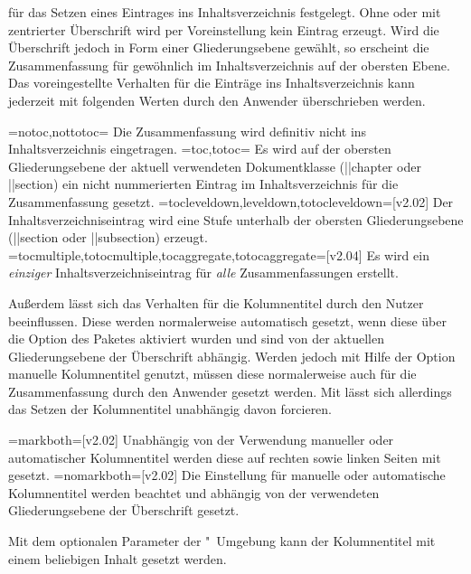 \begin{DeclareEntity*}{}
\begin{DeclareEntity*}{}
\begin{DeclareEntity*}{}
\begin{Declaration}
für das Setzen eines Eintrages ins Inhaltsverzeichnis festgelegt. Ohne oder mit 
zentrierter Überschrift wird per Voreinstellung kein Eintrag erzeugt. Wird die 
Überschrift jedoch in Form einer Gliederungsebene gewählt, so erscheint die 
Zusammenfassung für gewöhnlich im Inhaltsverzeichnis auf der obersten Ebene. 
Das voreingestellte Verhalten für die Einträge ins Inhaltsverzeichnis kann 
jederzeit mit folgenden Werten durch den Anwender überschrieben werden.
%
\begin{DeclareValues}
\itemval=notoc,nottotoc=
  Die Zusammenfassung wird definitiv nicht ins Inhaltsverzeichnis eingetragen.
\itemval=toc,totoc=
  Es wird auf der obersten Gliederungsebene der aktuell verwendeten 
  Dokumentklasse (\Macro||{chapter} oder \Macro||{section}) ein nicht 
  nummerierten Eintrag im Inhaltsverzeichnis für die Zusammenfassung gesetzt.
\itemval=tocleveldown,leveldown,totocleveldown=[v2.02]
  Der Inhaltsverzeichniseintrag wird eine Stufe unterhalb der obersten 
  Gliederungsebene (\Macro||{section} oder \Macro||{subsection}) erzeugt.
\itemval=tocmultiple,totocmultiple,tocaggregate,totocaggregate=[v2.04]
  Es wird ein \emph{einziger} Inhaltsverzeichniseintrag für \emph{alle} 
  Zusammenfassungen erstellt.
\end{DeclareValues}
%
Außerdem lässt sich das Verhalten für die Kolumnentitel durch den Nutzer 
beeinflussen. Diese werden normalerweise automatisch gesetzt, wenn diese über 
die Option  des Paketes  aktiviert 
wurden und sind von der aktuellen Gliederungsebene der Überschrift abhängig. 
Werden jedoch mit Hilfe der Option  manuelle Kolumnentitel 
genutzt, müssen diese normalerweise auch für die Zusammenfassung durch den 
Anwender gesetzt werden. Mit  lässt sich allerdings 
das Setzen der Kolumnentitel unabhängig davon forcieren.
%
\begin{DeclareValues}
\itemval=markboth=[v2.02]
  Unabhängig von der Verwendung manueller oder automatischer Kolumnentitel 
  werden diese auf rechten sowie linken Seiten mit  gesetzt.
\itemval=nomarkboth=[v2.02]
  Die Einstellung für manuelle oder automatische Kolumnentitel werden beachtet 
  und abhängig von der verwendeten Gliederungsebene der Überschrift gesetzt.
\end{DeclareValues}
%
Mit dem optionalen Parameter  der 
"~Umgebung kann der Kolumnentitel mit einem beliebigen 
Inhalt gesetzt werden.


\end{Declaration}
\end{DeclareEntity*}
\end{DeclareEntity*}
\end{DeclareEntity*}
